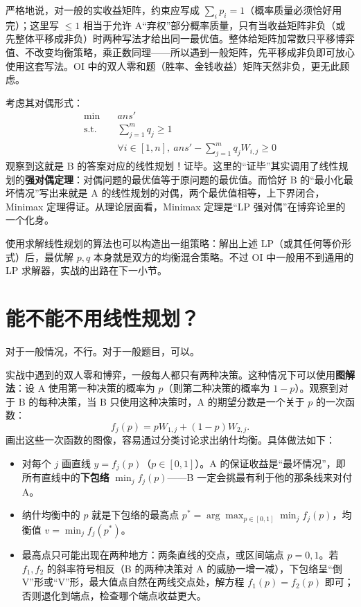 \documentclass[UTF8,a4paper,11pt,oneside,openany,fontset=fandol]{ctexbook}
\theoremstyle{definition}
\begin{document}
\begin{pitfall}[$\sum p_i\le1$ 还是 $\sum p_i=1$]
严格地说，对一般的实收益矩阵，约束应写成 $\sum_i p_i=1$（概率质量必须恰好用完）；这里写 $\le1$ 相当于允许 A“弃权”部分概率质量，只有当收益矩阵非负（或先整体平移成非负）时两种写法才给出同一最优值。整体给矩阵加常数只平移博弈值、不改变均衡策略，乘正数同理——所以遇到一般矩阵，先平移成非负即可放心使用这套写法。OI 中的双人零和题（胜率、金钱收益）矩阵天然非负，更无此顾虑。
\end{pitfall}

考虑其对偶形式：
\[
 \begin{aligned}
 \min\quad & ans'\\
 \text{s.t.}\quad & \sum_{j=1}^{m}q_j\ge1\\
 & \forall i\in[1,n],\ ans'-\sum_{j=1}^{m}q_jW_{i,j}\ge0
 \end{aligned}
\]
观察到这就是 B 的答案对应的线性规划！证毕。这里的“证毕”其实调用了线性规划的\textbf{强对偶定理}：对偶问题的最优值等于原问题的最优值。而恰好 B 的“最小化最坏情况”写出来就是 A 的线性规划的对偶，两个最优值相等，上下界闭合，Minimax 定理得证。从理论层面看，Minimax 定理是“LP 强对偶”在博弈论里的一个化身。

使用求解线性规划的算法也可以构造出一组策略：解出上述 LP（或其任何等价形式）后，最优解 $p,q$ 本身就是双方的均衡混合策略。不过 OI 中一般用不到通用的 LP 求解器，实战的出路在下一小节。

\section{能不能不用线性规划？}
对于一般情况，不行。对于一般题目，可以。

实战中遇到的双人零和博弈，一般每人都只有两种决策。这种情况下可以使用\textbf{图解法}：设 A 使用第一种决策的概率为 $p$（则第二种决策的概率为 $1-p$）。观察到对于 B 的每种决策，当 B 只使用这种决策时，A 的期望分数是一个关于 $p$ 的一次函数：
\[
 f_j(p)=pW_{1,j}+(1-p)W_{2,j}.
\]
画出这些一次函数的图像，容易通过分类讨论求出纳什均衡。具体做法如下：
\begin{itemize}
\item 对每个 $j$ 画直线 $y=f_j(p)$（$p\in[0,1]$）。A 的保证收益是“最坏情况”，即所有直线中的\textbf{下包络} $\min_j f_j(p)$——B 一定会挑最有利于他的那条线来对付 A。
\item 纳什均衡中的 $p$ 就是下包络的最高点 $p^*=\arg\max_{p\in[0,1]}\min_j f_j(p)$，均衡值 $v=\min_j f_j(p^*)$。
\item 最高点只可能出现在两种地方：两条直线的交点，或区间端点 $p=0,1$。若 $f_1,f_2$ 的斜率符号相反（B 的两种决策对 A 的威胁一增一减），下包络呈“倒 V”形或“V”形，最大值点自然在两线交点处，解方程 $f_1(p)=f_2(p)$ 即可；否则退化到端点，检查哪个端点收益更大。
\end{itemize}
\end{document}
